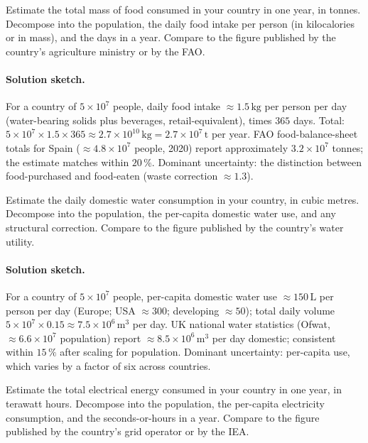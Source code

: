 \begin{exercise}
Estimate the total mass of food consumed in your country in one
year, in tonnes. Decompose into the population, the daily food
intake per person (in kilocalories or in mass), and the days in a
year. Compare to the figure published by the country's agriculture
ministry or by the FAO.
\end{exercise}

\paragraph{Solution sketch.}
For a country of $5 \times 10^{7}$ people, daily food intake $\approx
1.5 \,\si{\kilo\gram}$ per person per day (water-bearing solids
plus beverages, retail-equivalent), times $365$ days. Total: $5
\times 10^{7} \times 1.5 \times 365 \approx 2.7 \times 10^{10}
\,\si{\kilo\gram} = 2.7 \times 10^{7} \,\si{\tonne}$ per year. FAO
food-balance-sheet totals for Spain ($\approx 4.8 \times 10^{7}$
people, 2020) report approximately $3.2 \times 10^{7}$ tonnes; the
estimate matches within $20\,\%$. Dominant uncertainty: the
distinction between food-purchased and food-eaten (waste correction
$\approx 1.3$).

\begin{exercise}
Estimate the daily domestic water consumption in your country, in
cubic metres. Decompose into the population, the per-capita
domestic water use, and any structural correction. Compare to the
figure published by the country's water utility.
\end{exercise}

\paragraph{Solution sketch.}
For a country of $5 \times 10^{7}$ people, per-capita domestic
water use $\approx 150 \,\si{\liter}$ per person per day (Europe;
USA $\approx 300$; developing $\approx 50$); total daily volume
$5 \times 10^{7} \times 0.15 \approx 7.5 \times 10^{6}
\,\si{\meter\cubed}$ per day. UK national water statistics (Ofwat,
$\approx 6.6 \times 10^{7}$ population) report $\approx 8.5 \times
10^{6} \,\si{\meter\cubed}$ per day domestic; consistent within
$15\,\%$ after scaling for population. Dominant uncertainty:
per-capita use, which varies by a factor of six across countries.

\begin{exercise}
Estimate the total electrical energy consumed in your country in
one year, in terawatt hours. Decompose into the population, the
per-capita electricity consumption, and the seconds-or-hours in a
year. Compare to the figure published by the country's grid
operator or by the IEA.
\end{exercise}

